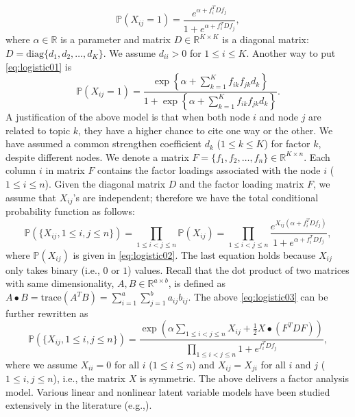 \documentclass[AMS,STIX1COL]{WileyNJD-v2}
\begin{document}
\begin{equation}
\label{eq:logistic01}
\mathbb{P}(X_{ij}=1) = \frac{e^{\alpha + f_i^T D f_j }}{1 + e^{\alpha + f_i^T D f_j }},
\end{equation}
where $\alpha \in \mathbb{R}$ is a parameter and matrix $D \in \mathbb{R}^{K \times K}$ is a diagonal matrix: $D = \mbox{diag}\{d_{1},d_{2},\ldots,d_{K}\}$. 
We assume $d_{ii} > 0$ for $1 \le i \le K$.
Another way to put \eqref{eq:logistic01} is
\begin{equation}
\label{eq:logistic02}
\mathbb{P}(X_{ij}=1) = \frac{\exp\left\{\alpha + \sum_{k=1}^K f_{ik}f_{jk}d_{k} \right\}}{1 + \exp\left\{\alpha + \sum_{k=1}^K f_{ik}f_{jk}d_{k} \right\}}. 
\end{equation}
A justification of the above model is that when both node $i$ and node $j$ are related to topic $k$, they have a higher chance to cite one way or the other. 
We have assumed a common strengthen coefficient $d_k$ ($1\le k \le K$) for factor $k$, despite different nodes. 
We denote a matrix $F = \{f_1, f_2, \ldots, f_n\} \in \mathbb{R}^{K \times n}$. 
Each column $i$ in matrix $F$ contains the factor loadings associated with the node $i$ ($1\le i \le n$). 
Given the diagonal matrix $D$ and the factor loading matrix $F$, we assume that $X_{ij}$'s are independent; therefore we have the total conditional probability function as follows:
\begin{equation}
\label{eq:logistic03}
\mathbb{P}(\{X_{ij}, 1\le i,j \le n\})
= \prod_{1\le i<j \le n} \mathbb{P}(X_{ij})
= \prod_{1\le i<j \le n}  \frac{e^{X_{ij}(\alpha + f_i^T D f_j) }}{1 + e^{\alpha + f_i^T D f_j }},
\end{equation}
where $\mathbb{P}(X_{ij})$ is given in \eqref{eq:logistic02}.
The last equation holds because $X_{ij}$ only takes binary (i.e., $0$ or $1$) values.
Recall that the dot product of two matrices with same dimensionality, $A,B\in \mathbb{R}^{a \times b}$, is defined as $A\bullet B=\mbox{trace}(A^T B) = \sum_{i=1}^a\sum_{j=1}^b a_{ij}b_{ij}$.
The above \eqref{eq:logistic03} can be further rewritten as
\begin{equation}
\label{eq:logistic04}
\mathbb{P}(\{X_{ij}, 1\le i,j \le n\})
= \frac{\exp(\alpha \sum_{1\le i< j\le n}X_{ij} +\frac{1}{2} X \bullet (F^T D F))}{\prod_{1\le i<j \le n}  1 + e^{f_i^T D f_j }},
\end{equation}
where we assume $X_{ii}=0$ for all $i$ ($1\le i \le n$) and $X_{ij} = X_{ji}$ for all $i$ and $j$ ($1\le i,j \le n$), i.e., the matrix $X$ is symmetric.
The above delivers a factor analysis model. 
Various linear and nonlinear latent variable models have been studied extensively in the literature (e.g.,\cite{joreskog1969general, mcdonald2014factor,lord2008statistical, rasch1980probabilistic, harman1960modern, joreskog1970general}).
\end{document}

